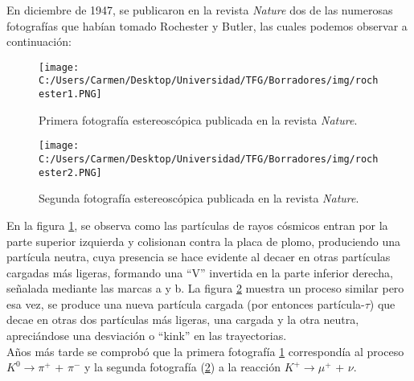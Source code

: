 En diciembre de 1947, se publicaron en la revista \textit{Nature} dos de las numerosas fotografías que habían tomado Rochester y Butler, las cuales podemos observar a continuación:



\begin{figure}[h]
	\centering
	\texttt{[image: C:/Users/Carmen/Desktop/Universidad/TFG/Borradores/img/rochester1.PNG]}
	\caption[Fotografía 1 de la primera detección de los mesones $K$]
	{Primera fotografía estereoscópica publicada en la revista \textit{Nature}. \cite{Nature1}}
	\label{fig:nature1}
\end{figure}

\begin{figure}[h]
	\centering
	\texttt{[image: C:/Users/Carmen/Desktop/Universidad/TFG/Borradores/img/rochester2.PNG]}
	\caption[Fotografía 2 de la primera detección de los mesones $K$]
	{Segunda fotografía estereoscópica publicada en la revista \textit{Nature}. \cite{Nature1}}
	\label{fig:nature2}
\end{figure}


En la figura \ref{fig:nature1}, se observa como las partículas de rayos cósmicos entran por la parte superior izquierda y colisionan contra la placa de plomo, produciendo una partícula neutra, cuya presencia se hace evidente al decaer en otras partículas cargadas más ligeras, formando una ``V'' invertida en la parte inferior derecha, señalada mediante las marcas a y b. La figura \ref{fig:nature2} muestra un proceso similar pero esa vez, se produce una nueva partícula cargada (por entonces partícula-$\tau$) que decae en otras dos partículas más ligeras, una cargada y la otra neutra, apreciándose una desviación o ``kink'' en las trayectorias.\\



Años más tarde se comprobó que la primera fotografía \ref{fig:nature1} correspondía al proceso  $K^0 \rightarrow \pi^+$ +  $\pi^- $ y la segunda fotografía (\ref{fig:nature2}) a la reacción $K^+ \rightarrow \mu^+$ + $\nu $.

